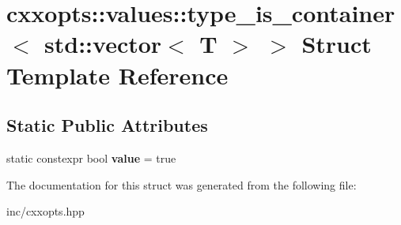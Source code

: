 \hypertarget{structcxxopts_1_1values_1_1type__is__container_3_01std_1_1vector_3_01T_01_4_01_4}{}\section{cxxopts\+:\+:values\+:\+:type\+\_\+is\+\_\+container$<$ std\+:\+:vector$<$ T $>$ $>$ Struct Template Reference}
\label{structcxxopts_1_1values_1_1type__is__container_3_01std_1_1vector_3_01T_01_4_01_4}
\subsection*{Static Public Attributes}
\begin{DoxyCompactItemize}
\item 
static constexpr bool {\bfseries value} = true\hypertarget{structcxxopts_1_1values_1_1type__is__container_3_01std_1_1vector_3_01T_01_4_01_4_a696f25c27190618461fa842bfe8adfb7}{}\label{structcxxopts_1_1values_1_1type__is__container_3_01std_1_1vector_3_01T_01_4_01_4_a696f25c27190618461fa842bfe8adfb7}

\end{DoxyCompactItemize}


The documentation for this struct was generated from the following file\+:\begin{DoxyCompactItemize}
\item 
inc/cxxopts.\+hpp\end{DoxyCompactItemize}
